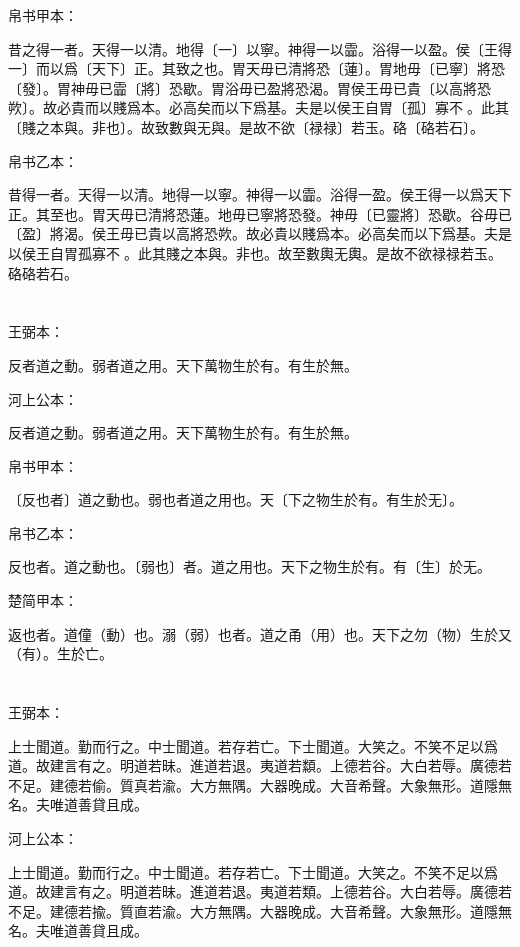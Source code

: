 \documentclass[a5paper]{ctexbook}
\begin{document}
    帛书甲本：

    昔之得一者。天得一以清。地得〔一〕以寧。神得一以霝。浴得一以盈。侯〔王得一〕而以爲〔天下〕正。其致之也。胃天毋已清將恐〔蓮〕。胃地毋〔已寧〕將恐〔發〕。胃神毋已霝〔將〕恐歇。胃浴毋已盈將恐渴。胃侯王毋已貴〔以高將恐欮〕。故必貴而以賤爲本。必高矣而以下爲基。夫是以侯王自胃〔孤〕寡不𥞤。此其〔賤之本與。非也〕。故致數與无與。是故不欲〔禄禄〕若玉。硌〔硌若石〕。

    帛书乙本：

    昔得一者。天得一以清。地得一以寧。神得一以霝。浴得一盈。侯王得一以爲天下正。其至也。胃天毋已清將恐蓮。地毋已寧將恐發。神毋〔已靈將〕恐歇。谷毋已〔盈〕將渴。侯王毋已貴以高將恐欮。故必貴以賤爲本。必高矣而以下爲基。夫是以侯王自胃孤寡不𥞤。此其賤之本與。非也。故至數輿无輿。是故不欲禄禄若玉。硌硌若石。

    \chapter{}
    王弼本：

    反者道之動。弱者道之用。天下萬物生於有。有生於無。

    河上公本：

    反者道之動。弱者道之用。天下萬物生於有。有生於無。

    帛书甲本：

    〔反也者〕道之動也。弱也者道之用也。天〔下之物生於有。有生於无〕。

    帛书乙本：

    反也者。道之動也。〔弱也〕者。道之用也。天下之物生於有。有〔生〕於无。

    楚简甲本：

    返也者。道僮（動）也。溺（弱）也者。道之甬（用）也。天下之勿（物）生於又（有）。生於亡。

    \chapter{}
    王弼本：

    上士聞道。勤而行之。中士聞道。若存若亡。下士聞道。大笑之。不笑不足以爲道。故建言有之。明道若昧。進道若退。夷道若纇。上德若谷。大白若辱。廣德若不足。建德若偷。質真若渝。大方無隅。大器晚成。大音希聲。大象無形。道隱無名。夫唯道善貸且成。

    河上公本：

    上士聞道。勤而行之。中士聞道。若存若亡。下士聞道。大笑之。不笑不足以爲道。故建言有之。明道若昧。進道若退。夷道若類。上德若谷。大白若辱。廣德若不足。建德若揄。質直若渝。大方無隅。大器晚成。大音希聲。大象無形。道隱無名。夫唯道善貸且成。
\end{document}
